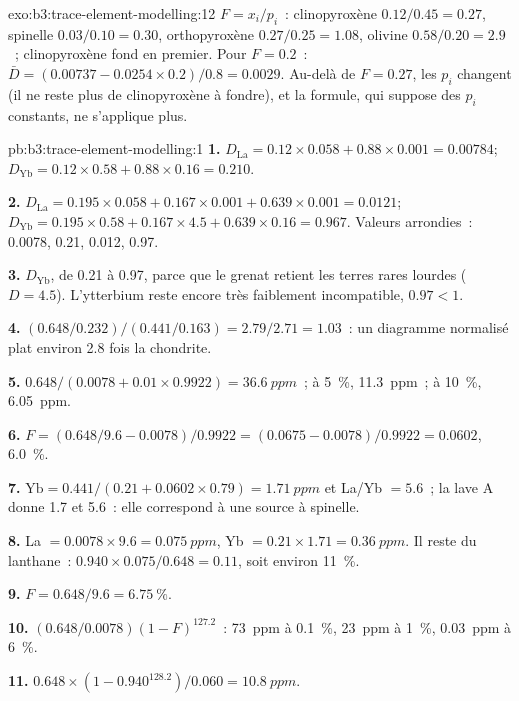 \begin{solution}{exo:b3:trace-element-modelling:12}
$F = x_i/p_i$~: clinopyroxène $0.12/0.45 = 0.27$, spinelle $0.03/0.10 = 0.30$,
orthopyroxène $0.27/0.25 = 1.08$, olivine $0.58/0.20 = 2.9$~; clinopyroxène
fond en premier. Pour $F = 0.2$~: $\bar D = (0.00737 - 0.0254\times0.2)/0.8 =
0.0029$. Au-delà de $F = 0.27$, les $p_i$ changent (il ne reste plus de clinopyroxène à fondre),
et la formule, qui suppose des $p_i$ constants, ne s'applique plus.
\end{solution}

\begin{solution}{pb:b3:trace-element-modelling:1}
\textbf{1.} $D_{\mathrm{La}} = 0.12\times0.058 + 0.88\times0.001 = 0.00784$;
$D_{\mathrm{Yb}} = 0.12\times0.58 + 0.88\times0.16 = 0.210$.

\textbf{2.} $D_{\mathrm{La}} = 0.195\times0.058 + 0.167\times0.001 +
0.639\times0.001 = 0.0121$; $D_{\mathrm{Yb}} = 0.195\times0.58 +
0.167\times4.5 + 0.639\times0.16 = 0.967$. Valeurs arrondies~: 0.0078, 0.21, 0.012, 0.97.

\textbf{3.} $D_{\mathrm{Yb}}$, de 0.21 à 0.97, parce que le grenat retient les
terres rares lourdes ($D = 4.5$). L'ytterbium reste encore très faiblement incompatible,
$0.97 < 1$.

\textbf{4.} $(0.648/0.232)/(0.441/0.163) = 2.79/2.71 = 1.03$~: un diagramme normalisé plat
environ 2.8 fois la chondrite.

\textbf{5.} $0.648/(0.0078 + 0.01\times0.9922) = \qty{36.6}{ppm}$~; à
\qty{5}{\percent}, \qty{11.3}{ppm}~; à \qty{10}{\percent}, \qty{6.05}{ppm}.

\textbf{6.} $F = (0.648/9.6 - 0.0078)/0.9922 = (0.0675 - 0.0078)/0.9922 =
0.0602$, \qty{6.0}{\percent}.

\textbf{7.} $\mathrm{Yb} = 0.441/(0.21 + 0.0602\times0.79) = \qty{1.71}{ppm}$
et La/Yb $= 5.6$~; la lave A donne 1.7 et 5.6~: elle correspond à une source à spinelle.

\textbf{8.} La $= 0.0078\times9.6 = \qty{0.075}{ppm}$, Yb $= 0.21\times1.71 =
\qty{0.36}{ppm}$. Il reste du lanthane~: $0.940\times0.075/0.648 = 0.11$, soit environ
\qty{11}{\percent}.

\textbf{9.} $F = 0.648/9.6 = \qty{6.75}{\percent}$.

\textbf{10.} $(0.648/0.0078)(1 - F)^{127.2}$~: \qty{73}{ppm} à
\qty{0.1}{\percent}, \qty{23}{ppm} à \qty{1}{\percent}, \qty{0.03}{ppm} à
\qty{6}{\percent}.

\textbf{11.} $0.648\times(1 - 0.940^{128.2})/0.060 = \qty{10.8}{ppm}$.


\end{solution}

